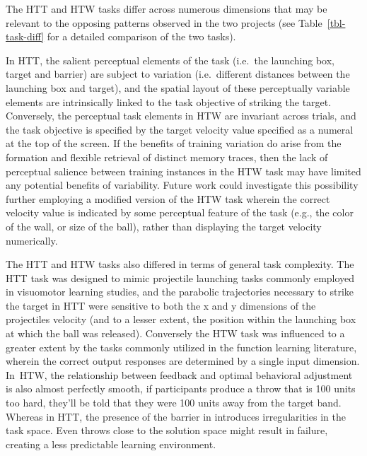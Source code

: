 \documentclass[
  11pt,
  letterpaper,
]{article}
\begin{document}
The HTT and HTW tasks differ across numerous dimensions that may be
relevant to the opposing patterns observed in the two projects (see
Table~\ref{tbl-task-diff} for a detailed comparison of the two tasks).

In HTT, the salient perceptual elements of the task (i.e.~the launching
box, target and barrier) are subject to variation (i.e.~different
distances between the launching box and target), and the spatial layout
of these perceptually variable elements are intrinsically linked to the
task objective of striking the target. Conversely, the perceptual task
elements in HTW are invariant across trials, and the task objective is
specified by the target velocity value specified as a numeral at the top
of the screen. If the benefits of training variation do arise from the
formation and flexible retrieval of distinct memory traces, then the
lack of perceptual salience between training instances in the HTW task
may have limited any potential benefits of variability. Future work
could investigate this possibility further employing a modified version
of the HTW task wherein the correct velocity value is indicated by some
perceptual feature of the task (e.g., the color of the wall, or size of
the ball), rather than displaying the target velocity numerically.

The HTT and HTW tasks also differed in terms of general task complexity.
The HTT task was designed to mimic projectile launching tasks commonly
employed in visuomotor learning studies, and the parabolic trajectories
necessary to strike the target in HTT were sensitive to both the x and y
dimensions of the projectiles velocity (and to a lesser extent, the
position within the launching box at which the ball was released).
Conversely the HTW task was influenced to a greater extent by the tasks
commonly utilized in the function learning literature, wherein the
correct output responses are determined by a single input dimension.
In~HTW, the relationship between feedback and optimal behavioral
adjustment is also almost perfectly smooth, if participants produce a
throw that is 100 units too hard, they'll be told that they were 100
units away from the target band. Whereas in HTT, the presence of the
barrier in introduces irregularities in the task space. Even throws
close to the solution space might result in failure, creating a less
predictable learning environment.
\end{document}
